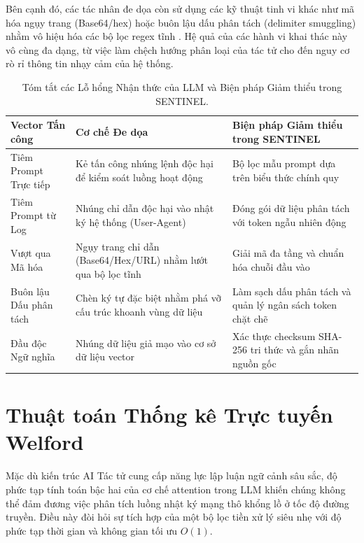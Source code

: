 Bên cạnh đó, các tác nhân đe dọa còn sử dụng các kỹ thuật tinh vi khác như mã hóa ngụy trang (Base64/hex) hoặc buôn lậu dấu phân tách (delimiter smuggling) nhằm vô hiệu hóa các bộ lọc regex tĩnh \cite{promptinjection2023}. Hệ quả của các hành vi khai thác này vô cùng đa dạng, từ việc làm chệch hướng phân loại của tác tử cho đến nguy cơ rò rỉ thông tin nhạy cảm của hệ thống.

\begin{table}[H]
    \centering
    \caption{Tóm tắt các Lỗ hổng Nhận thức của LLM và Biện pháp Giảm thiểu trong SENTINEL.}
    \label{tab:vulnerabilities_mitigations}
    \begin{tabular}{|>{\raggedright\arraybackslash}p{}|>{\raggedright\arraybackslash}p{}|>{\raggedright\arraybackslash}p{}|}
        \hline
        \textbf{Vector Tấn công} & \textbf{Cơ chế Đe dọa} & \textbf{Biện pháp Giảm thiểu trong SENTINEL} \\
        \hline
        Tiêm Prompt Trực tiếp & Kẻ tấn công nhúng lệnh độc hại để kiểm soát luồng hoạt động & Bộ lọc mẫu prompt dựa trên biểu thức chính quy \\
        \hline
        Tiêm Prompt từ Log & Nhúng chỉ dẫn độc hại vào nhật ký hệ thống (User-Agent) & Đóng gói dữ liệu phân tách với token ngẫu nhiên động \\
        \hline
        Vượt qua Mã hóa & Ngụy trang chỉ dẫn (Base64/Hex/URL) nhằm lướt qua bộ lọc tĩnh & Giải mã đa tầng và chuẩn hóa chuỗi đầu vào \\
        \hline
        Buôn lậu Dấu phân tách & Chèn ký tự đặc biệt nhằm phá vỡ cấu trúc khoanh vùng dữ liệu & Làm sạch dấu phân tách và quản lý ngân sách token chặt chẽ \\
        \hline
        Đầu độc Ngữ nghĩa & Nhúng dữ liệu giả mạo vào cơ sở dữ liệu vector & Xác thực checksum SHA-256 tri thức và gắn nhãn nguồn gốc \\
        \hline
    \end{tabular}
\end{table}

\section{Thuật toán Thống kê Trực tuyến Welford}
\label{sec:welford}

Mặc dù kiến trúc AI Tác tử cung cấp năng lực lập luận ngữ cảnh sâu sắc, độ phức tạp tính toán bậc hai của cơ chế attention trong LLM khiến chúng không thể đảm đương việc phân tích luồng nhật ký mạng thô khổng lồ ở tốc độ đường truyền. Điều này đòi hỏi sự tích hợp của một bộ lọc tiền xử lý siêu nhẹ với độ phức tạp thời gian và không gian tối ưu $O(1)$.

